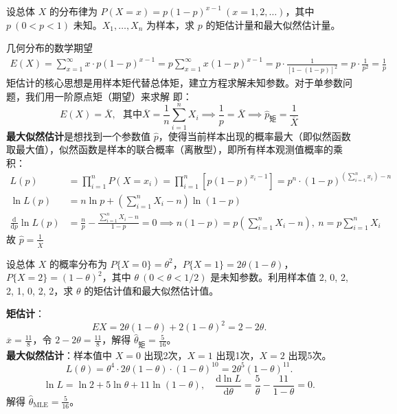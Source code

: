 ﻿\documentclass[lang=cn,11pt]{elegantbook}
\begin{document}
\begin{exercise}\label{exer:7-geometric}
设总体 \(X\) 的分布律为 \(P(X=x) = p(1-p)^{x-1}\ (x=1,2,\dots)\)，其中 \(p\ (0<p<1)\) 未知。\(X_1, \dots, X_n\) 为样本，求 \(p\) 的矩估计量和最大似然估计量。
\end{exercise}
\begin{solution}
几何分布的数学期望
\begin{align*}
E(X) = \sum_{x=1}^\infty x \cdot p(1-p)^{x-1} = p \sum_{x=1}^\infty x(1-p)^{x-1} = p \cdot \frac{1}{[1-(1-p)]^2} = p \cdot \frac{1}{p^2} = \frac{1}{p}
\end{align*}
矩估计的核心思想是用样本矩代替总体矩，建立方程求解未知参数。对于单参数问题，我们用一阶原点矩（期望）来求解
即：
$$E(X) = \overline{X},~~~\text{其中}\overline{X} = \frac{1}{n}\sum_{i=1}^n X_i\implies \frac1p=\overline{X}\implies \hat{p}_{\text{矩}} = \frac1{\overline{X}}$$
\textbf{最大似然估计}是想找到一个参数值 $\hat{p}$，使得当前样本出现的概率最大（即似然函数取最大值），似然函数是样本的联合概率（离散型），即所有样本观测值概率的乘积：
\begin{align*}
L(p) &= \prod_{i=1}^n P(X=x_i) = \prod_{i=1}^n \left[ p(1-p)^{x_i-1} \right]=  p^n \cdot (1-p)^{\left( \sum_{i=1}^n x_i \right) - n}\\
\ln L(p) &= n\ln p + \left( \sum_{i=1}^n X_i - n \right) \ln(1-p)\\
\frac{\mathrm{d}}{\mathrm{d}p} \ln L(p) &= \frac{n}{p} - \frac{\sum_{i=1}^n X_i - n}{1-p} = 0\implies n(1-p) = p\left( \sum_{i=1}^n X_i - n \right),~n = p\sum_{i=1}^n X_i
\end{align*}
故 \(\hat{p} = \frac{1}{\overline{X}}\)
\end{solution}

\begin{exercise}\label{exer:7-discrete-3val}
设总体 \(X\) 的概率分布为 \(P\{X=0\} = \theta^2\)，\(P\{X=1\} = 2\theta(1-\theta)\)，\(P\{X=2\} = (1-\theta)^2\)，其中 \(\theta\ (0 < \theta < 1/2)\) 是未知参数。利用样本值 2, 0, 2, 2, 1, 0, 2, 2，求 \(\theta\) 的矩估计值和最大似然估计值。
\end{exercise}
\begin{solution}
\textbf{矩估计}：
\[
EX = 2\theta(1-\theta) + 2(1-\theta)^2 = 2-2\theta.
\]
\(\overline{x} = \frac{11}{8}\)，令 \(2-2\theta = \frac{11}{8}\)，解得 \(\hat{\theta}_{\text{矩}} = \frac{5}{16}\)。\\
\textbf{最大似然估计}：样本值中 \(X=0\) 出现2次，\(X=1\) 出现1次，\(X=2\) 出现5次。
\[
L(\theta) = \theta^4\cdot2\theta(1-\theta)\cdot(1-\theta)^{10} = 2\theta^5(1-\theta)^{11}.
\]
\[
\ln L = \ln 2 + 5\ln\theta + 11\ln(1-\theta),\quad \frac{\mathrm{d}\ln L}{\mathrm{d}\theta} = \frac{5}{\theta} - \frac{11}{1-\theta} = 0.
\]
解得 \(\hat{\theta}_{\text{MLE}} = \frac{5}{16}\)。
\end{solution}
\end{document}
